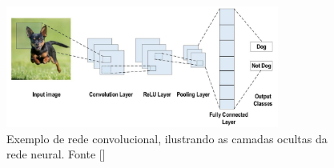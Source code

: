 \begin{figure}
    \centering
    \includegraphics[width=0.8\textwidth]{figs/theory-cnn-example.png}
    \caption{Exemplo de rede convolucional, ilustrando as camadas ocultas da rede neural. Fonte []}
    \label{fig:theory-cnn-example}
\end{figure}

